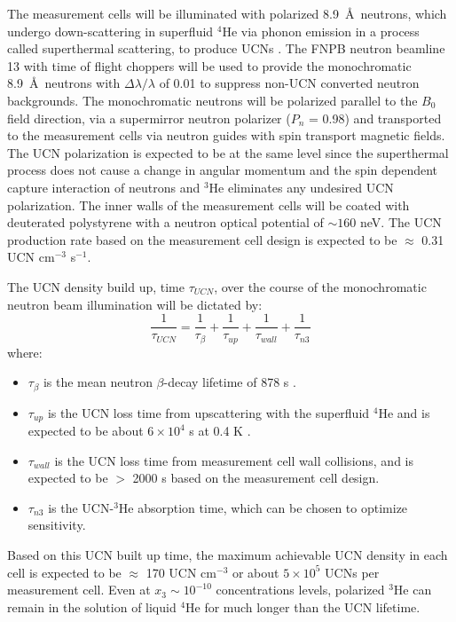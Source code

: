 The measurement cells will be illuminated with polarized 8.9~\AA\ neutrons, which undergo down-scattering in superfluid $^4$He via phonon emission in a process called superthermal scattering, to produce UCNs \cite{Golub1977, Golub1983, Golub1975}. The FNPB neutron beamline 13 with time of flight choppers will be used to provide the monochromatic 8.9~\AA\ neutrons with $\Delta \lambda / \lambda $ of 0.01 to suppress non-UCN converted neutron backgrounds. The monochromatic neutrons will be polarized parallel to the $B_0$ field direction, via a supermirror neutron polarizer ($P_n$ = 0.98) and transported to the measurement cells via neutron guides with spin transport magnetic fields. The UCN polarization is expected to be at the same level since the superthermal process does not cause a change in angular momentum and the spin dependent capture interaction of neutrons and $^3$He eliminates any undesired UCN polarization. The inner walls of the measurement cells will be coated with deuterated polystyrene with a neutron optical potential of $\sim160$ neV. The UCN production rate based on the measurement cell design is expected to be $\approx$ 0.31 UCN cm$^{-3}$ s$^{-1}$.

The UCN density build up, time $\tau_{UCN}$, over the course of the monochromatic neutron beam illumination will be dictated by:
\begin{equation}
    \frac{1}{\tau_{UCN}} = \frac{1}{\tau_{\beta}} + \frac{1}{\tau_{up}} + \frac{1}{\tau_{wall}} + \frac{1}{\tau_{n3}}
    \label{eq:UCN_losstime}
\end{equation}
where:
\begin{itemize}
    \item $\tau_{\beta}$ is the mean neutron $\beta$-decay lifetime of 878 s \cite{PDG2022}. 
    \item $\tau_{up} $ is the UCN loss time from upscattering with the superfluid $^4$He and is expected to be about $ 6 \times 10^4$ s at 0.4 K \cite{Golub1983, Golub1979, Ye2009}.
    \item $\tau_{wall}$ is the UCN loss time from measurement cell wall collisions, and is expected to be $ > $ 2000 s based on the measurement cell design.
    \item $\tau_{n3}$ is the UCN-$^3$He absorption time, which can be chosen to optimize sensitivity.
\end{itemize}
Based on this UCN built up time, the maximum achievable UCN density in each cell is expected to be $\approx$ 170 UCN cm$^{-3}$ or about $5\times10^5$ UCNs per measurement cell. Even at $x_3 \sim 10^{-10}$ concentrations levels, polarized $^3$He can remain in the solution of liquid $^4$He for much longer than the UCN lifetime.

